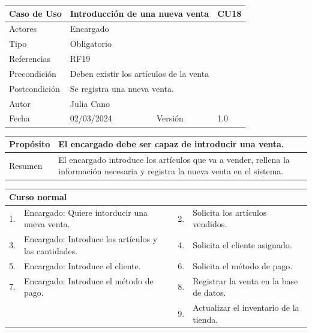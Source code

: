 \begin{table}[H]
	\centering
	\begin{tabular}{| m{} | m{} | m{} | m{}|}
		\hline
		\rowcolor{grayshade} Caso de Uso & \multicolumn{2}{|m{0.43\textwidth}|}{Introducción de una nueva venta} &  CU18\\ 
		\hline
		Actores & \multicolumn{3}{l|}{Encargado} \\ 
		\hline
		Tipo & \multicolumn{3}{l|}{Obligatorio} \\ 
		\hline
		Referencias & \multicolumn{3}{l|}{RF19} \\ 
		\hline
		Precondición & \multicolumn{3}{m{0.67\textwidth}|}{Deben existir los artículos de la venta} \\ 
		\hline
		Postcondición & \multicolumn{3}{m{0.67\textwidth}|}{Se registra una nueva venta.} \\ 
		\hline
		Autor & \multicolumn{3}{l|}{Julia Cano} \\ 
		\hline
		Fecha & 02/03/2024 & Versión & 1.0 \\
		\hline
	\end{tabular}
\end{table}

\begin{table}[H]
	\centering
	\begin{tabular}{| m{} | m{} | m{} | m{} |}
		\hline
		Propósito & \multicolumn{3}{m{0.67\textwidth}|}{El encargado debe ser capaz de introducir una venta.}  \\ 
		\hline
		Resumen & \multicolumn{3}{m{0.67\textwidth}|}{El encargado introduce los artículos que va a vender, rellena la información necesaria y registra la nueva venta en el sistema.} \\ 
		\hline
	\end{tabular}
\end{table}


\begin{table}[H]
	\centering
	\begin{tabular}{| m{} | m{} | m{} | m{} |}
		\hline
		\multicolumn{4}{|m{0.9\textwidth}|}{Curso normal}     \\ 
		\hline
		1. & Encargado: Quiere intorducir una nueva venta. & 2. &  Solicita los artículos vendidos.  \\ 
		\hline
		3. & Encargado: Introduce los artículos y las cantidades. & 4. &  Solicita el cliente asignado.  \\ 
		\hline
		5. & Encargado: Introduce el cliente. & 6. & Solicita el método de pago.  \\ 
		\hline
		7. & Encargado: Introduce el método de pago. & 8. & Registrar la venta en la base de datos.  \\ 
		\hline
		&  & 9. &  Actualizar el inventario de la tienda.  \\ 
		\hline
	\end{tabular}
\end{table}

